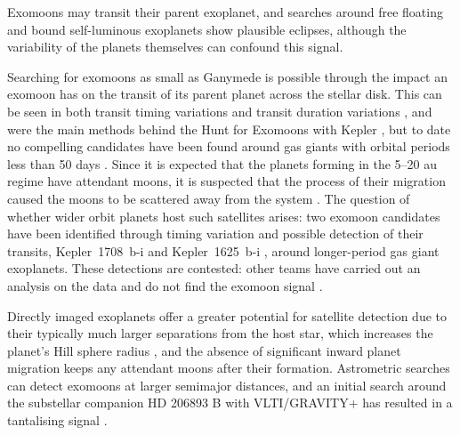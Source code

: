 \documentclass[fleqn,usenatbib]{mnras}
\begin{document}
Exomoons may transit their parent exoplanet, and searches around free floating \citep{Limbach21,Limbach24b,Wilson25} and bound \citep{2025arXiv251115317K,2026arXiv260405235P} self-luminous exoplanets show plausible eclipses, although the variability of the planets themselves can confound this signal.

Searching for exomoons as small as Ganymede is possible through the impact an exomoon has on the transit of its parent planet across the stellar disk.
%
This can be seen in both transit timing variations and transit duration variations \citep{Kipping09,Kipping09a}, and were the main methods behind the Hunt for Exomoons with Kepler \citep[HEK; ][]{Kipping12,Kipping13,Kipping22}, but to date no compelling candidates have been found around gas giants with orbital periods less than 50 days \citep{Kipping15}.
%
Since it is expected that the planets forming in the 5--20 au regime have attendant moons, it is suspected that the process of their migration caused the moons to be scattered away from the system \citep{Dobos21}.
%
The question of whether wider orbit planets host such satellites arises: two exomoon candidates have been identified through timing variation and possible detection of their transits, \mbox{Kepler~1708~b-i} and \mbox{Kepler~1625~b-i} \citep{Teachey18,Kipping22,Teachey18b,Kipping25}, around longer-period gas giant exoplanets.
%
These detections are contested: other teams have carried out an analysis on the data and do not find the exomoon signal \citep{Kreidberg19,Heller24}.

Directly imaged exoplanets offer a greater potential for satellite detection due to their typically much larger separations from the host star, which increases the planet's Hill sphere radius \citep{Dobos21}, and the absence of significant inward planet migration keeps any attendant moons after their formation.
%
Astrometric searches can detect exomoons at larger semimajor distances, and an initial search around the substellar companion HD 206893 B with VLTI/GRAVITY+ has resulted in a tantalising signal \citep{2025arXiv251120091K}.

\end{document}
